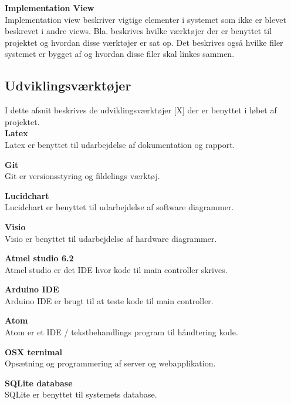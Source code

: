 \textbf{Implementation View}\\
Implementation view beskriver vigtige elementer i systemet som ikke er blevet beskrevet i andre views. Bla. beskrives hvilke værktøjer der er benyttet til projektet og hvordan disse værktøjer er sat op. Det beskrives også hvilke filer systemet er bygget af og hvordan disse filer skal linkes sammen.


\newpage
\subsection{Udviklingsværktøjer}
I dette afsnit beskrives de udviklingsværktøjer [X] der er benyttet i løbet af projektet. \\

\textbf{Latex}\\
Latex er benyttet til udarbejdelse af dokumentation og rapport. 

\textbf{Git}\\
Git er versionsstyring og fildelings værktøj.

\textbf{Lucidchart}\\
Lucidchart er benyttet til udarbejdelse af software diagrammer.

\textbf{Visio}\\
Visio er benyttet til udarbejdelse af hardware diagrammer.

\textbf{Atmel studio 6.2}\\
Atmel studio er det IDE hvor kode til main controller skrives.

\textbf{Arduino IDE}\\
Arduino IDE er brugt til at teste kode til main controller.

\textbf{Atom}\\
Atom er et IDE / tekstbehandlings program til håndtering kode.

\textbf{OSX ternimal}\\
Opsætning og programmering af server og webapplikation. 

\textbf{SQLite database}\\
SQLite er benyttet til systemets database.